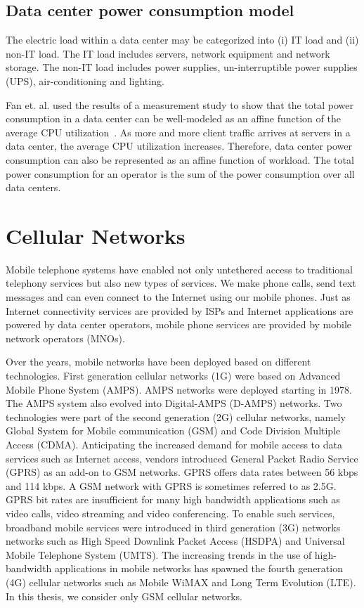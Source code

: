 \subsection{Data center power consumption model} 
The electric load within a data center may be categorized into (i) IT load and (ii) non-IT load. The IT load includes servers, network equipment and network storage. The non-IT load includes power supplies, un-interruptible power supplies (UPS), air-conditioning and lighting. 

Fan et. al. used the results of a measurement study to show that the total power consumption in a data center can be well-modeled as an affine function of the average CPU utilization~\cite{Fan:power:ICSA:2007}. As more and more client traffic arrives at servers in a data center, the average CPU utilization increases. Therefore, data center power consumption can also be represented as an affine function of workload. The total power consumption for an operator is the sum of the power consumption over all data centers. 

\section{Cellular Networks} %
Mobile telephone systems have enabled not only untethered access to traditional telephony services but also new types of services. We make phone calls, send text messages and can even connect to the Internet using our mobile phones. Just as Internet connectivity services are provided by ISPs and Internet applications are powered by data center operators, mobile phone services are provided by mobile network operators (MNOs).  

Over the years, mobile networks have been deployed based on different technologies. First generation cellular networks (1G) were based on Advanced Mobile Phone System (AMPS). AMPS networks were deployed starting in 1978. The AMPS system also evolved into Digital-AMPS (D-AMPS) networks. Two technologies were part of the second generation (2G) cellular networks, namely Global System for Mobile communication (GSM) and Code Division Multiple Access (CDMA). Anticipating the increased demand for mobile access to data services such as Internet access, vendors introduced General Packet Radio Service (GPRS) as an add-on to GSM networks. GPRS offers data rates between 56 kbps and 114 kbps. A GSM network with GPRS is sometimes referred to as 2.5G. GPRS bit rates are insufficient for many high bandwidth applications such as video calls, video streaming and video conferencing. To enable such services, broadband mobile services were introduced in third generation (3G) networks networks such as High Speed Downlink Packet Access (HSDPA) and Universal Mobile Telephone System (UMTS). The increasing trends in the use of high-bandwidth applications in mobile networks has spawned the fourth generation (4G) cellular networks such as Mobile WiMAX and Long Term Evolution (LTE). In this thesis, we consider only GSM cellular networks.

